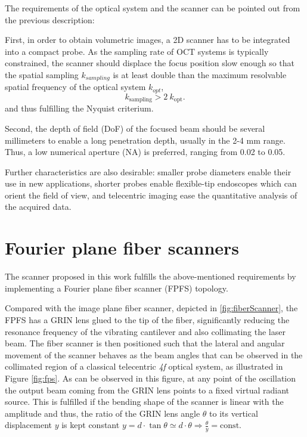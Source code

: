 \documentclass[10pt]{iopart}
\begin{document}
The requirements of the optical system and the scanner can be pointed out from the previous description: 

First, in order to obtain volumetric images, a 2D scanner has to be integrated into a compact probe. As the sampling rate of OCT systems is typically constrained, the scanner should displace the focus position slow enough so that the spatial sampling $k_{sampling}$ is at least double than the maximum resolvable spatial frequency of the optical system $k_{opt}$,
\begin{equation}
k_\mathrm{sampling} > 2 \ k_\mathrm{opt}.
\end{equation}
and thus fulfilling the Nyquist criterium.

Second, the depth of field (DoF) of the focused beam should be several millimeters to enable a long penetration depth, usually in the 2-4 mm range. Thus, a low numerical aperture (NA) is preferred, ranging from 0.02 to 0.05.

Further characteristics are also desirable: smaller probe diameters enable their use in new applications, shorter probes enable flexible-tip endoscopes which can orient the field of view, and telecentric imaging ease the quantitative analysis of the acquired data.


\section{Fourier plane fiber scanners}


The scanner proposed in this work fulfills the above-mentioned requirements by implementing a Fourier plane fiber scanner (FPFS) topology. 

Compared with the image plane fiber scanner, depicted in \autoref{fig:fiberScanner}, the FPFS has a GRIN lens glued to the tip of the fiber, significantly reducing the resonance frequency of the vibrating cantilever and also collimating the laser beam. The fiber scanner is then positioned such that the lateral and angular movement of the scanner behaves as the beam angles that can be observed in the collimated region of a classical telecentric \textit{4f} optical system, as illustrated in Figure \ref{fig:fps}. As can be observed in this figure, at any point of the oscillation the output beam coming from the GRIN lens points to a fixed virtual radiant source. This is fulfilled if the bending shape of the scanner is linear with the amplitude and thus, the ratio of the GRIN lens angle $\theta$ to its vertical displacement $y$ is kept constant $ y = d \cdot \tan \theta \simeq d \cdot \theta \Rightarrow \frac{\theta}{y} = \mathrm{const} $. 
\end{document}

